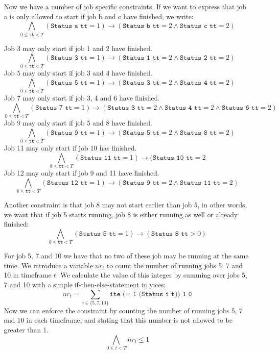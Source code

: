 \documentclass[12pt]{article}
\begin{document}
Now we have a number of job specific constraints. 
If we want to express that job a is only allowed to start if job b and c have finished, we write: 
\[ \bigwedge_{0 \le \texttt{tt} < T} (\texttt{Status a tt} = 1) \rightarrow (\texttt{Status b tt} = 2 \wedge \texttt{Status c tt} = 2) \]

Job 3 may only start if job 1 and 2 have finished.
\[ \bigwedge_{0 \le \texttt{tt} < T} (\texttt{Status 3 tt} = 1) \rightarrow (\texttt{Status 1 tt} = 2 \wedge \texttt{Status 2 tt} = 2) \]
Job 5 may only start if job 3 and 4 have finished.
\[ \bigwedge_{0 \le \texttt{tt} < T} (\texttt{Status 5 tt} = 1) \rightarrow (\texttt{Status 3 tt} = 2 \wedge \texttt{Status 4 tt} = 2) \]
Job 7 may only start if job 3, 4 and 6 have finished.
\[ \bigwedge_{0 \le \texttt{tt} < T} (\texttt{Status 7 tt} = 1) \rightarrow (\texttt{Status 3 tt} = 2 \wedge \texttt{Status 4 tt} = 2 \wedge \texttt{Status 6 tt} = 2) \]
Job 9 may only start if job 5 and 8 have finished.
\[ \bigwedge_{0 \le \texttt{tt} < T} (\texttt{Status 9 tt} = 1) \rightarrow (\texttt{Status 5 tt} = 2 \wedge \texttt{Status 8 tt} = 2) \]
Job 11 may only start if job 10 has finished.
\[ \bigwedge_{0 \le \texttt{tt} < T} (\texttt{Status 11 tt} = 1) \rightarrow (\texttt{Status 10 tt} = 2\]
Job 12 may only start if job 9 and 11 have finished.
\[ \bigwedge_{0 \le \texttt{tt} < T} (\texttt{Status 12 tt} = 1) \rightarrow (\texttt{Status 9 tt} = 2 \wedge \texttt{Status 11 tt} = 2) \]

Another constraint is that job 8 may not start earlier than job 5, in other words, we want that if job 5 starts running, job 8 is either running as well or already finished:
\[ \bigwedge_{0 \le \texttt{tt} < T} (\texttt{Status 5 tt} = 1) \rightarrow (\texttt{Status 8 tt} > 0) \]

For job 5, 7 and 10 we have that no two of these job may be running at the same time. 
We introduce a variable $nr_t$ to count the number of running jobs 5, 7 and 10 in timeframe $t$.
We calculate the value of this integer by summing over jobs 5, 7 and 10 with a simple if-then-else-statement in yices: 
\[ nr_t = \sum_{i \in \{5,7,10\}} \texttt{ite (= 1 (Status i t)) 1 0} \]
Now we can enforce the constraint by counting the number of running jobs 5, 7 and 10 in each timeframe, 
and stating that this number is not allowed to be greater than 1. 
\[ \bigwedge_{0 \le t < T} nr_t \le 1\]
\end{document}
